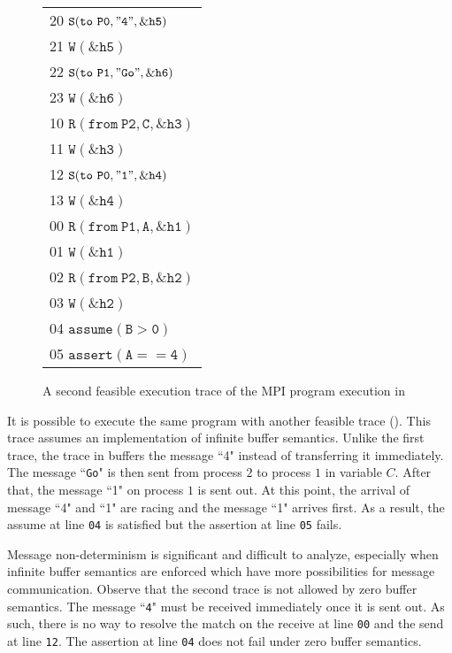 \begin{figure}[t]
\begin{center}
\setlength{\tabcolsep}{2pt}
\small \begin{tabular}[t]{l}
20 $\mathtt{S(to\ P0, "4", \&h5)}$ \\
21 $\mathtt{W(\&h5)}$\\
22 $\mathtt{S(to\ P1, "Go", \&h6)}$ \\
23 $\mathtt{W(\&h6)}$ \\
\hline
10 $\mathtt{R(from\ P2, C, \&h3)}$ \\
11 $\mathtt{W(\&h3)}$ \\
12 $\mathtt{S(to\ P0, "1", \&h4)}$ \\
13 $\mathtt{W(\&h4)}$ \\
\hline
00 $\mathtt{R(from\ P1, A, \&h1)}$ \\
01 $\mathtt{W(\&h1)}$ \\
02 $\mathtt{R(from\ P2, B, \&h2)}$ \\
03 $\mathtt{W(\&h2)}$ \\
04 $\mathtt{assume(B > 0)}$ \\
05 $\mathtt{assert(A == 4)}$ \\
\hline
\end{tabular}
\end{center}
\caption{A second feasible execution trace of the MPI program execution in }
\label{fig:trace2}
\end{figure}

It is possible to execute the same program with another feasible trace (). This trace assumes an implementation of infinite buffer semantics. Unlike the first trace, the trace in  buffers the message ``4" instead of transferring it immediately. The message ``\texttt{Go}" is then sent from process $2$ to process $1$ in variable $C$. After that, the message ``1" on process $1$ is sent out. At this point, the arrival of message ``4" and ``1" are racing and the message ``1" arrives first. As a result, the assume at line \texttt{04} is satisfied but the assertion at line \texttt{05} fails.

Message non-determinism is significant and difficult to analyze, especially when infinite buffer semantics are enforced which have more possibilities for message communication. Observe that the second trace is not allowed by zero buffer semantics. The message ``\texttt{4}" must be received immediately once it is sent out. As such, there is no way to resolve the match on the receive at line \texttt{00} and the send at line \texttt{12}.  The assertion at line \texttt{04} does not fail under zero buffer semantics. 


